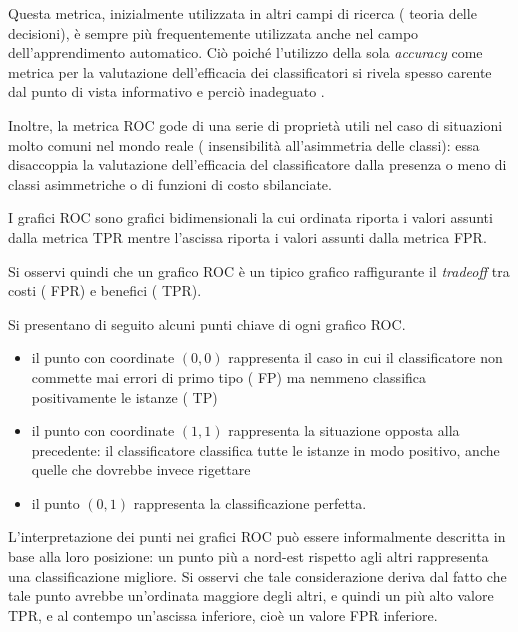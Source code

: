 Questa metrica, inizialmente utilizzata in altri campi di ricerca (\eg{} teoria delle decisioni), è sempre più frequentemente utilizzata anche nel campo dell'apprendimento automatico. Ciò poiché l'utilizzo della sola \emph{accuracy} come metrica per la valutazione dell'efficacia dei classificatori si rivela spesso carente dal punto di vista informativo e perciò inadeguato \citep[per approfondimenti si veda][]{Provost1997,Provost2001}.

Inoltre, la metrica \acs{ROC} gode di una serie di proprietà utili nel caso di situazioni molto comuni nel mondo reale (\eg{} insensibilità all'asimmetria delle classi): essa disaccoppia la valutazione dell'efficacia del classificatore dalla presenza o meno di classi asimmetriche o di funzioni di costo sbilanciate.

I grafici \acs{ROC} sono grafici bidimensionali la cui ordinata riporta i valori assunti dalla metrica \acs{TPR} mentre l'ascissa riporta i valori assunti dalla metrica \acs{FPR}.

Si osservi quindi che un grafico \acs{ROC} è un tipico grafico raffigurante il \emph{tradeoff} tra costi (\ie{} \acs{FPR}) e benefici (\ie{} \acs{TPR}).

Si presentano di seguito alcuni punti chiave di ogni grafico \acs{ROC}.
\begin{itemize}
	\item il punto con coordinate $(0,0)$ rappresenta il caso in cui il classificatore non commette mai errori di primo tipo (\ie{} \acf{FP}) ma nemmeno classifica positivamente le istanze (\ie{} \acf{TP})
	\item il punto con coordinate $(1,1)$ rappresenta la situazione opposta alla precedente: il classificatore classifica tutte le istanze in modo positivo, anche quelle che dovrebbe invece rigettare
	\item il punto $(0,1)$ rappresenta la classificazione perfetta.
\end{itemize}
L'interpretazione dei punti nei grafici \acs{ROC} può essere informalmente descritta in base alla loro posizione: un punto più a nord-est rispetto agli altri rappresenta una classificazione migliore. Si osservi che tale considerazione deriva dal fatto che tale punto avrebbe un'ordinata maggiore degli altri, e quindi un più alto valore \acs{TPR}, e al contempo un'ascissa inferiore, cioè un valore \acs{FPR} inferiore.

